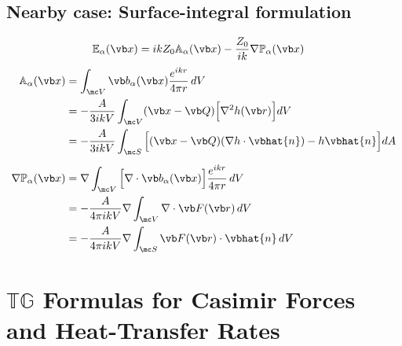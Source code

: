 \documentclass[letterpaper]{article}
\begin{document}
\subsection*{Nearby case: Surface-integral formulation}

\begin{align*}
 \mathbb{E}_{\alpha}(\vb x)
&=   ikZ_0 \mathbb{A}_{\alpha}(\vb x) 
  - \frac{Z_0}{ik} \nabla \mathbb{P}_\alpha(\vb x)
\end{align*}
\begin{align*}
\mathbb{A}_{\alpha}(\vb x)
&= \int_{\mc V} \vb b_\alpha(\vb x) \frac{e^{ikr}}{4\pi r}\, dV
\\
&= -\frac{A}{3ikV} \int_{\mc V} (\vb x - \vb Q) \Big[\nabla^2 h(\vb r)\Big] dV
\\
&= -\frac{A}{3ikV} \int_{\mc S} \Big[ (\vb x - \vb Q) (\nabla h \cdot \vbhat{n})
                                  - h \vbhat{n}
                             \Big] dA
\\[5pt]
\nabla \mathbb{P}_\alpha(\vb x)
&= \nabla
   \int_{\mc V} \Big[ \nabla \cdot \vb b_\alpha(\vb x) \Big]
                \frac{e^{ikr}}{4\pi r}\, dV
\\
&= -\frac{A}{4\pi ik V}\nabla 
    \int_{\mc V} \nabla \cdot \vb F(\vb r)\, dV
\\
&= -\frac{A}{4\pi ik V}\nabla 
    \int_{\mc S} \vb F(\vb r) \cdot \vbhat{n}\, dV
\\
\end{align*}

\newpage
\section{$\mathbb{T}\mathbb{G}$ Formulas
         for Casimir Forces and Heat-Transfer Rates}
\end{document}
